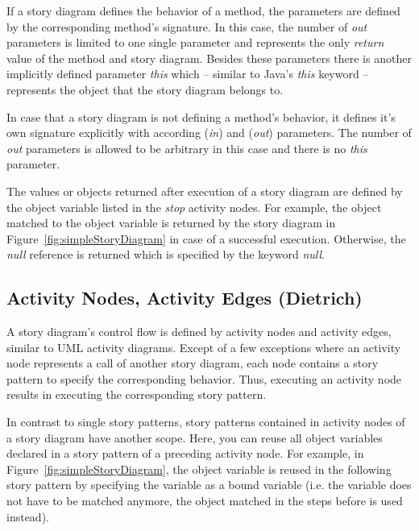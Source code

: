 If a story diagram defines the behavior of a method, the parameters are defined by the corresponding method's signature.
In this case, the number of \emph{out} parameters is limited to one single parameter and represents the only \emph{return} value of the method and story diagram.
Besides these parameters there is another implicitly defined parameter \emph{this}
which -- similar to Java's \emph{this} keyword -- represents the object that the story diagram belongs to.

In case that a story diagram is not defining a method's behavior, it defines it's own signature explicitly with according (\emph{in}) and (\emph{out}) parameters.
The number of \emph{out} parameters is allowed to be arbitrary in this case and there is no \emph{this} parameter.

The values or objects returned after execution of a story diagram are defined by the object variable listed in the \emph{stop} activity nodes.
For example, the object matched to the object variable  is returned by the story diagram in Figure~\ref{fig:simpleStoryDiagram} in case of a successful execution.
Otherwise, the \emph{null} reference is returned which is specified by the keyword \emph{null}.


\subsection{Activity Nodes, Activity Edges (Dietrich)}


A story diagram's control flow is defined by activity nodes and activity edges, similar to UML activity diagrams.
Except of a few exceptions where an activity node represents a call of another story diagram,
each node contains a story pattern to specify the corresponding behavior.
Thus, executing an activity node results in executing the corresponding story pattern.

In contrast to single story patterns, story patterns contained in activity nodes of a story diagram have another scope.
Here, you can reuse all object variables declared in a story pattern of a preceding activity node.
For example, in Figure~\ref{fig:simpleStoryDiagram}, the object variable  is reused in the following story pattern
by specifying the variable as a bound variable
(i.e. the variable does not have to be matched anymore, the object matched in the steps before is used instead).

